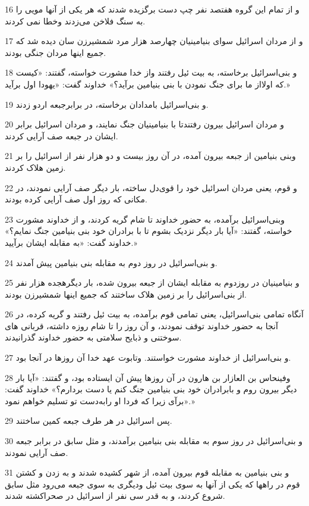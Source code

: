 \par 16 و از تمام این گروه هفتصد نفر چپ دست برگزیده شدند که هر یکی از آنها مویی را به سنگ فلاخن می‌زدند وخطا نمی کردند.
\par 17 و از مردان اسرائیل سوای بنیامینیان چهارصد هزار مرد شمشیرزن سان دیده شد که جمیع اینها مردان جنگی بودند.
\par 18 و بنی‌اسرائیل برخاسته، به بیت ئیل رفتند واز خدا مشورت خواسته، گفتند: «کیست که اولااز ما برای جنگ نمودن با بنی بنیامین برآید؟» خداوند گفت: «یهودا اول برآید.»
\par 19 و بنی‌اسرائیل بامدادان برخاسته، در برابرجبعه اردو زدند.
\par 20 و مردان اسرائیل بیرون رفتندتا با بنیامینیان جنگ نمایند، و مردان اسرائیل برابر ایشان در جبعه صف آرایی کردند.
\par 21 وبنی بنیامین از جبعه بیرون آمده، در آن روز بیست و دو هزار نفر از اسرائیل را بر زمین هلاک کردند.
\par 22 و قوم، یعنی مردان اسرائیل خود را قوی‌دل ساخته، بار دیگر صف آرایی نمودند، در مکانی که روز اول صف آرایی کرده بودند.
\par 23 وبنی‌اسرائیل برآمده، به حضور خداوند تا شام گریه کردند، و از خداوند مشورت خواسته، گفتند: «آیا بار دیگر نزدیک بشوم تا با برادران خود بنی بنیامین جنگ نمایم؟» خداوند گفت: «به مقابله ایشان برآیید.»
\par 24 و بنی‌اسرائیل در روز دوم به مقابله بنی بنیامین پیش آمدند.
\par 25 و بنیامینیان در روزدوم به مقابله ایشان از جبعه بیرون شده، بار دیگرهجده هزار نفر از بنی‌اسرائیل را بر زمین هلاک ساختند که جمیع اینها شمشیرزن بودند.
\par 26 آنگاه تمامی بنی‌اسرائیل، یعنی تمامی قوم برآمده، به بیت ئیل رفتند و گریه کرده، در آنجا به حضور خداوند توقف نمودند، و آن روز را تا شام روزه داشته، قربانی های سوختنی و ذبایح سلامتی به حضور خداوند گذرانیدند.
\par 27 و بنی‌اسرائیل از خداوند مشورت خواستند. وتابوت عهد خدا آن روزها در آنجا بود.
\par 28 وفینحاس بن العازار بن هارون در آن روزها پیش آن ایستاده بود، و گفتند: «آیا بار دیگر بیرون روم و بابرادران خود بنی بنیامین جنگ کنم یا دست بردارم؟» خداوند گفت: «برآی زیرا که فردا او رابه‌دست تو تسلیم خواهم نمود.»
\par 29 پس اسرائیل در هر طرف جبعه کمین ساختند.
\par 30 و بنی‌اسرائیل در روز سوم به مقابله بنی بنیامین برآمدند، و مثل سابق در برابر جبعه صف آرایی نمودند.
\par 31 و بنی بنیامین به مقابله قوم بیرون آمده، از شهر کشیده شدند و به زدن و کشتن قوم در راهها که یکی از آنها به سوی بیت ئیل ودیگری به سوی جبعه می‌رود مثل سابق شروع کردند، و به قدر سی نفر از اسرائیل در صحراکشته شدند.
